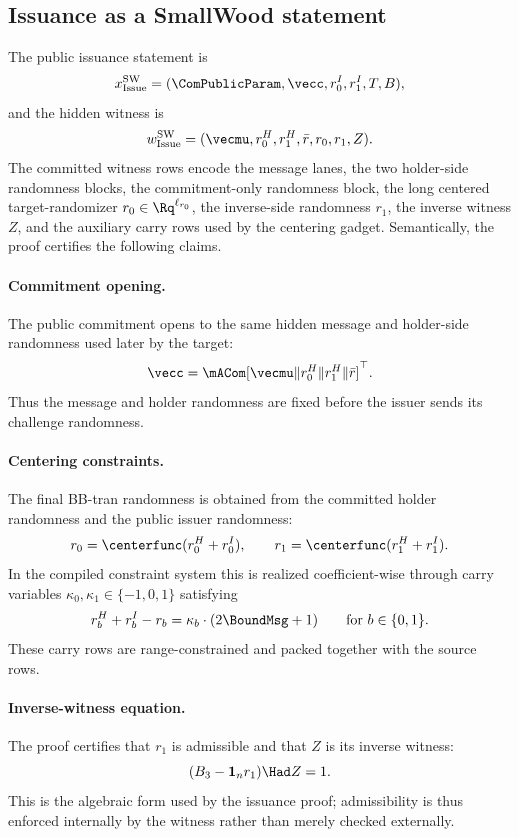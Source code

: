 \subsection{Issuance as a SmallWood statement}
\label{subsec:smallwood-issuance}
\label{subsec:presign-compiled}
The public issuance statement is
\[
  x^{\mathrm{SW}}_{\mathrm{Issue}}=(\ComPublicParam,\vecc,r_0^I,r_1^I,T,B),
\]
and the hidden witness is
\[
  w^{\mathrm{SW}}_{\mathrm{Issue}}=(\vecmu,r_0^H,r_1^H,\bar r,r_0,r_1,Z).
\]
The committed witness rows encode the message lanes, the two holder-side randomness blocks, the commitment-only
randomness block, the long centered target-randomizer $r_0\in\Rq^{\ell_{r_0}}$, the inverse-side randomness $r_1$, the inverse witness $Z$, and the auxiliary carry rows used
by the centering gadget.  Semantically, the proof certifies the following claims.

\paragraph{Commitment opening.}
The public commitment opens to the same hidden message and holder-side randomness used later by the target:
\[
  \vecc=\mACom[\vecmu\Vert r_0^H\Vert r_1^H\Vert \bar r]^\top.
\]
Thus the message and holder randomness are fixed before the issuer sends its challenge randomness.

\paragraph{Centering constraints.}
The final BB-tran randomness is obtained from the committed holder randomness and the public issuer randomness:
\[
  r_0=\centerfunc(r_0^H+r_0^I),
  \qquad
  r_1=\centerfunc(r_1^H+r_1^I).
\]
In the compiled constraint system this is realized coefficient-wise through carry variables
$\kappa_0,\kappa_1\in\{-1,0,1\}$ satisfying
\[
  r_b^H+r_b^I-r_b=\kappa_b\cdot(2\BoundMsg+1)
  \qquad\text{for }b\in\{0,1\}.
\]
These carry rows are range-constrained and packed together with the source rows.

\paragraph{Inverse-witness equation.}
The proof certifies that $r_1$ is admissible and that $Z$ is its inverse witness:
\[
  (B_3-\mathbf 1_n r_1)\Had Z=1.
\]
This is the algebraic form used by the issuance proof; admissibility is thus enforced internally by the witness
rather than merely checked externally.

